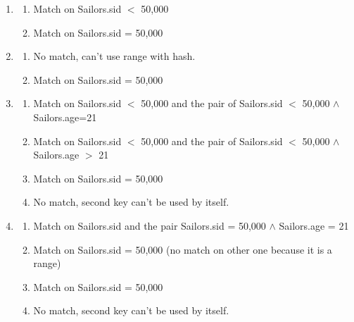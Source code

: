 \begin{problem}{12.4}
  \begin{solution}
    \begin{enumerate}
      \item \begin{enumerate}[label=\Alph*]
        \item Match on Sailors.sid $<$ 50,000\\
        \item Match on Sailors.sid = 50,000
      \end{enumerate}
      \item \begin{enumerate}[label=\Alph*]
        \item No match, can't use range with hash.\\
        \item Match on Sailors.sid = 50,000
      \end{enumerate}
      \item \begin{enumerate}[label=\Alph*]
        \item Match on Sailors.sid $<$ 50,000 and the pair of Sailors.sid $<$ 50,000 $\land$ Sailors.age=21 \\
        \item Match on Sailors.sid $<$ 50,000 and the pair of Sailors.sid $<$ 50,000 $\land$ Sailors.age $>$ 21 \\
        \item Match on Sailors.sid = 50,000 \\
        \item No match, second key can't be used by itself.
      \end{enumerate}
      \item \begin{enumerate}[label=\Alph*]
        \item Match on Sailors.sid and the pair Sailors.sid = 50,000 $\land$ Sailors.age = 21 \\
        \item Match on Sailors.sid = 50,000 (no match on other one because it is a range) \\
        \item Match on Sailors.sid = 50,000 \\
        \item No match, second key can't be used by itself.
      \end{enumerate}
    \end{enumerate}
  \end{solution}
\end{problem}

\begin{problem}{12.6}
\end{problem}



